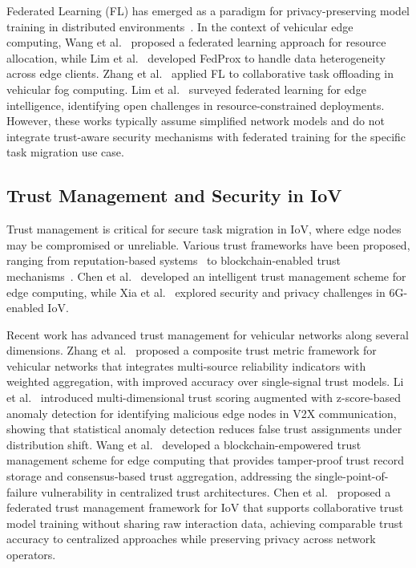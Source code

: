 \documentclass[10pt,letterpaper]{article}
\begin{document}
Federated Learning (FL) has emerged as a paradigm for privacy-preserving model training in distributed environments~\cite{mcmahan2017fedavg, kairouz2021advances}. In the context of vehicular edge computing, Wang et al.~\cite{wang2020federated} proposed a federated learning approach for resource allocation, while Lim et al.~\cite{lim2021federated} developed FedProx to handle data heterogeneity across edge clients. Zhang et al.~\cite{zhang2021federated} applied FL to collaborative task offloading in vehicular fog computing. Lim et al.~\cite{ref_fl_edge} surveyed federated learning for edge intelligence, identifying open challenges in resource-constrained deployments. However, these works typically assume simplified network models and do not integrate trust-aware security mechanisms with federated training for the specific task migration use case.

\subsection*{Trust Management and Security in IoV}

Trust management is critical for secure task migration in IoV, where edge nodes may be compromised or unreliable. Various trust frameworks have been proposed, ranging from reputation-based systems~\cite{li2021trust} to blockchain-enabled trust mechanisms~\cite{zhang2020trust}. Chen et al.~\cite{chen2022intelligent} developed an intelligent trust management scheme for edge computing, while Xia et al.~\cite{xia2021security} explored security and privacy challenges in 6G-enabled IoV.

Recent work has advanced trust management for vehicular networks along several dimensions. Zhang et al.~\cite{zhang2023trust_composite} proposed a composite trust metric framework for vehicular networks that integrates multi-source reliability indicators with weighted aggregation, with improved accuracy over single-signal trust models. Li et al.~\cite{li2022trust_multidim} introduced multi-dimensional trust scoring augmented with z-score-based anomaly detection for identifying malicious edge nodes in V2X communication, showing that statistical anomaly detection reduces false trust assignments under distribution shift. Wang et al.~\cite{wang2023trust_blockchain} developed a blockchain-empowered trust management scheme for edge computing that provides tamper-proof trust record storage and consensus-based trust aggregation, addressing the single-point-of-failure vulnerability in centralized trust architectures. Chen et al.~\cite{chen2024trust_federated} proposed a federated trust management framework for IoV that supports collaborative trust model training without sharing raw interaction data, achieving comparable trust accuracy to centralized approaches while preserving privacy across network operators.
\end{document}
